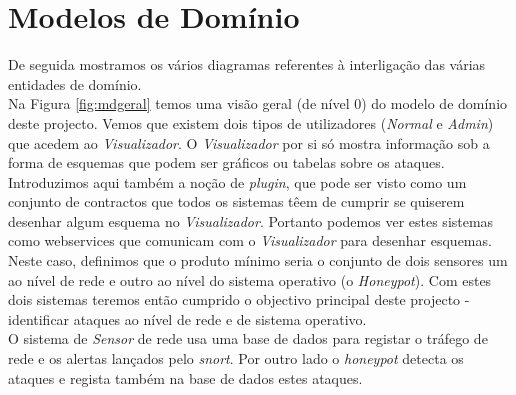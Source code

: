 \section{Modelos de Domínio}
De seguida mostramos os vários diagramas referentes à interligação das várias entidades de domínio.\\
Na Figura \ref{fig:mdgeral} temos uma visão geral (de nível 0) do modelo de domínio deste projecto. Vemos que existem dois tipos de utilizadores (\emph{Normal} e \emph{Admin})
que acedem ao \emph{Visualizador}. O \emph{Visualizador} por si só mostra informação sob a forma de esquemas que podem ser gráficos ou tabelas sobre os ataques.\\

Introduzimos aqui também a noção de \emph{plugin}, que pode ser visto como um conjunto de contractos que todos os sistemas têem de cumprir se quiserem desenhar
algum esquema no \emph{Visualizador}. Portanto podemos ver estes sistemas como webservices que comunicam com o \emph{Visualizador} para desenhar esquemas.\\

Neste caso, definimos que o produto mínimo seria o conjunto de dois sensores um ao nível de rede e outro ao nível do sistema operativo (o \emph{Honeypot}).
Com estes dois sistemas teremos então cumprido o objectivo principal deste projecto - identificar ataques ao nível de rede e de sistema operativo.\\
O sistema de \emph{Sensor} de rede usa uma base de dados para registar o tráfego de rede e os alertas lançados pelo \emph{snort}. Por outro lado o \emph{honeypot}
detecta os ataques e regista também na base de dados estes ataques.

